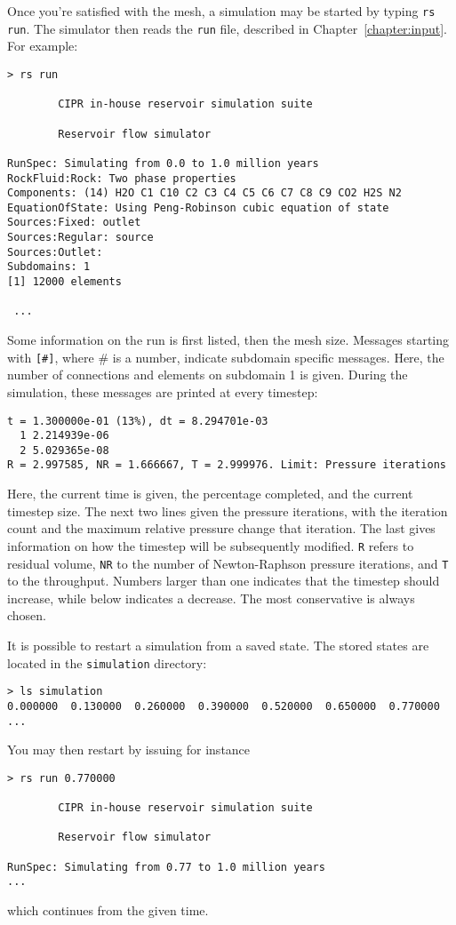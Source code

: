 

Once you're satisfied with the mesh, a simulation may be started by
typing \texttt{rs run}. The simulator then reads the \texttt{run}
file, described in Chapter~\ref{chapter:input}. For example:
\begin{verbatim}
> rs run

        CIPR in-house reservoir simulation suite

        Reservoir flow simulator

RunSpec: Simulating from 0.0 to 1.0 million years
RockFluid:Rock: Two phase properties
Components: (14) H2O C1 C10 C2 C3 C4 C5 C6 C7 C8 C9 CO2 H2S N2
EquationOfState: Using Peng-Robinson cubic equation of state
Sources:Fixed: outlet
Sources:Regular: source
Sources:Outlet:
Subdomains: 1
[1] 12000 elements

 ...

\end{verbatim}
Some information on the run is first listed, then the mesh size.
Messages starting with \texttt{[\#]}, where \# is a number, indicate
subdomain specific messages. Here, the number of connections and
elements on subdomain 1 is given. During the simulation, these
messages are printed at every timestep:
\begin{verbatim}
t = 1.300000e-01 (13%), dt = 8.294701e-03
  1 2.214939e-06
  2 5.029365e-08
R = 2.997585, NR = 1.666667, T = 2.999976. Limit: Pressure iterations
\end{verbatim}
Here, the current time is given, the percentage completed, and the
current timestep size. The next two lines given the pressure
iterations, with the iteration count and the maximum relative pressure
change that iteration. The last gives information on how the timestep
will be subsequently modified. \texttt{R} refers to residual volume,
\texttt{NR} to the number of Newton-Raphson pressure iterations, and
\texttt{T} to the throughput.  Numbers larger than one indicates that
the timestep should increase, while below indicates a decrease. The
most conservative is always chosen.

It is possible to restart a simulation from a saved state. The stored
states are located in the \texttt{simulation} directory:
\begin{verbatim}
> ls simulation
0.000000  0.130000  0.260000  0.390000  0.520000  0.650000  0.770000 ...
\end{verbatim}
You may then restart by issuing for instance
\begin{verbatim}
> rs run 0.770000

        CIPR in-house reservoir simulation suite

        Reservoir flow simulator

RunSpec: Simulating from 0.77 to 1.0 million years
...
\end{verbatim}
which continues from the given time.

